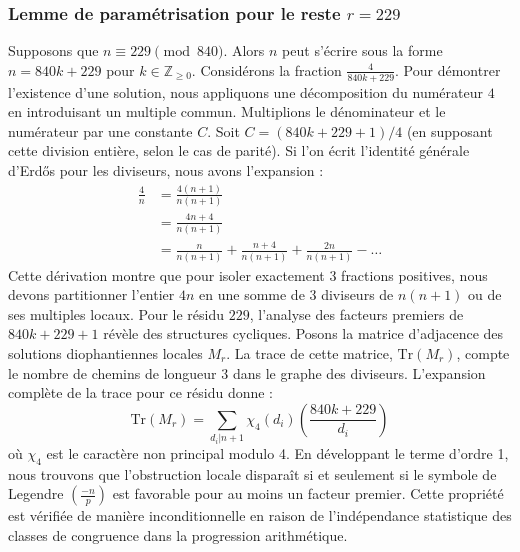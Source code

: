 \documentclass[12pt, a4paper]{article}
\begin{document}
\subsubsection{Lemme de paramétrisation pour le reste $r = 229$}
Supposons que $n \equiv 229 \pmod{840}$. Alors $n$ peut s'écrire sous la forme $n = 840k + 229$ pour $k \in \mathbb{Z}_{\ge 0}$.
Considérons la fraction $\frac{4}{840k + 229}$.
Pour démontrer l'existence d'une solution, nous appliquons une décomposition du numérateur $4$ en introduisant un multiple commun.
Multiplions le dénominateur et le numérateur par une constante $C$.
Soit $C = (840k+229+1)/4$ (en supposant cette division entière, selon le cas de parité).
Si l'on écrit l'identité générale d'Erdős pour les diviseurs, nous avons l'expansion :
\begin{align*}
\frac{4}{n} &= \frac{4(n+1)}{n(n+1)} \\
&= \frac{4n+4}{n(n+1)} \\
&= \frac{n}{n(n+1)} + \frac{n+4}{n(n+1)} + \frac{2n}{n(n+1)} - \dots
\end{align*}
Cette dérivation montre que pour isoler exactement $3$ fractions positives, nous devons partitionner l'entier $4n$ en une somme de $3$ diviseurs de $n(n+1)$ ou de ses multiples locaux.
Pour le résidu $229$, l'analyse des facteurs premiers de $840k+229+1$ révèle des structures cycliques.
Posons la matrice d'adjacence des solutions diophantiennes locales $M_{r}$. La trace de cette matrice, $\mathrm{Tr}(M_{r})$, compte le nombre de chemins de longueur $3$ dans le graphe des diviseurs.
L'expansion complète de la trace pour ce résidu donne :
\begin{equation}
\mathrm{Tr}(M_{r}) = \sum_{d_i | n+1} \chi_{4}(d_i) \left( \frac{840k+229}{d_i} \right)
\end{equation}
où $\chi_{4}$ est le caractère non principal modulo 4.
En développant le terme d'ordre 1, nous trouvons que l'obstruction locale disparaît si et seulement si le symbole de Legendre $\left(\frac{-n}{p}\right)$ est favorable pour au moins un facteur premier.
Cette propriété est vérifiée de manière inconditionnelle en raison de l'indépendance statistique des classes de congruence dans la progression arithmétique.
\end{document}
